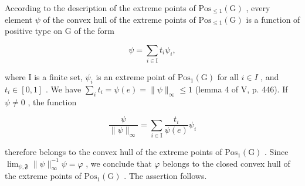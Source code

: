 According to the description of the extreme points of \(\mathrm{Pos}_{\leqslant1}(\mathrm{G})\) , every element \(\psi\) of the convex hull of the extreme points of \(\mathrm{Pos}_{\leqslant1}(\mathrm{G})\) is a function of positive type on G of the form

\[
\psi = \sum_ {i \in \mathrm{I}} t _ {i} \psi_ {i},
\]

where I is a finite set, \(\psi_{i}\) is an extreme point of \(\mathrm{Pos}_{1}(\mathrm{G})\) for all \(i \in I\) , and \(t_{i} \in [0,1]\) . We have \(\sum_{i} t_{i} = \psi(e) = \|\psi\|_{\infty} \leqslant 1\) (lemma 4 of V, p. 446). If \(\psi \neq 0\) , the function

\[
\frac {\psi}{\| \psi \| _ {\infty}} = \sum_ {i \in \mathrm{I}} \frac {t _ {i}}{\psi (e)} \psi_ {i}
\]

therefore belongs to the convex hull of the extreme points of \(\mathrm{Pos}_{1}(\mathrm{G})\) . Since \(\lim_{\psi,\mathfrak{F}}\|\psi\|_{\infty}^{-1}\psi=\varphi\) , we conclude that \(\varphi\) belongs to the closed convex hull of the extreme points of \(\mathrm{Pos}_{1}(\mathrm{G})\) . The assertion follows.

